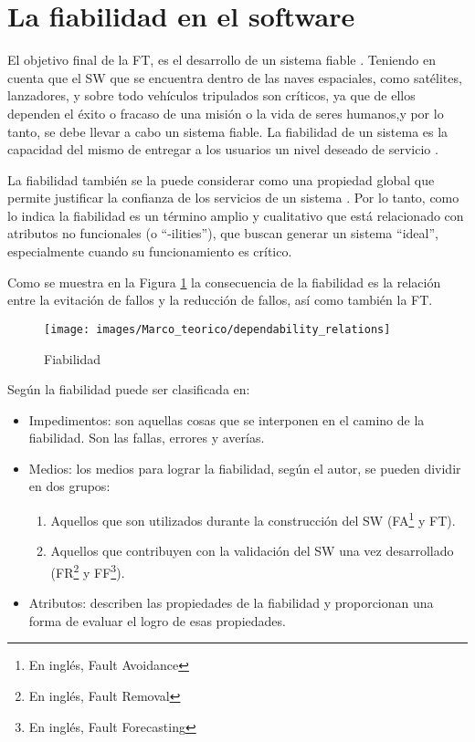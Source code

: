 \section{La fiabilidad en el software}\label{sec:fiabilidad_software}
El objetivo final de la \ac{FT}, es el desarrollo de un sistema fiable \citep{FTDesign}. Teniendo
en cuenta que el \ac{SW} que se encuentra dentro de las naves espaciales, como satélites,
lanzadores, y sobre todo vehículos tripulados son críticos, ya que de ellos dependen el éxito o
fracaso de una misión o la vida de seres humanos,y por lo tanto, se debe llevar a cabo un sistema fiable.
La fiabilidad de un sistema es la capacidad del mismo de entregar a los usuarios un nivel
deseado de servicio \citep{FTDesign}.

La fiabilidad también se la puede considerar como una propiedad global que permite justificar la
confianza de los servicios de un sistema \citep{FTAvionics}. Por lo tanto, como lo indica
\cite{FTAvionics} la fiabilidad es un término amplio y cualitativo que está relacionado con
atributos no funcionales (o ``-ilities''), que buscan generar un sistema ``ideal'', especialmente
cuando su funcionamiento es crítico.

Como se muestra en la Figura \ref{fig:dependability_relations} la consecuencia de la fiabilidad es
la relación entre la evitación de fallos y la reducción de fallos, así como también la \ac{FT}.

\begin{figure}[h]
 \centering
 \texttt{[image: images/Marco\_teorico/dependability\_relations]}
  \caption{Fiabilidad \protect\citep{FTAvionics}}
\label{fig:dependability_relations}
\end{figure}

Según \cite{Pullum01} la fiabilidad puede ser clasificada en:
\begin{itemize}
 \item Impedimentos: son aquellas cosas que se interponen en el camino de la fiabilidad. Son las
fallas, errores y averías.
 \item Medios: los medios para lograr la fiabilidad, según el autor, se pueden dividir en dos
grupos:
  \begin{enumerate}
    \item Aquellos que son utilizados durante la construcción del \ac{SW} (\ac{FA}\footnote{En
    inglés, Fault Avoidance} y \ac{FT}).
    \item Aquellos que contribuyen con la validación del \ac{SW} una vez desarrollado
    (\ac{FR}\footnote{En inglés, Fault Removal} y \ac{FF}\footnote{En inglés, Fault Forecasting}).
  \end{enumerate}

 \item Atributos: describen las propiedades de la fiabilidad y proporcionan una forma de evaluar el
logro de esas propiedades.
\end{itemize}

